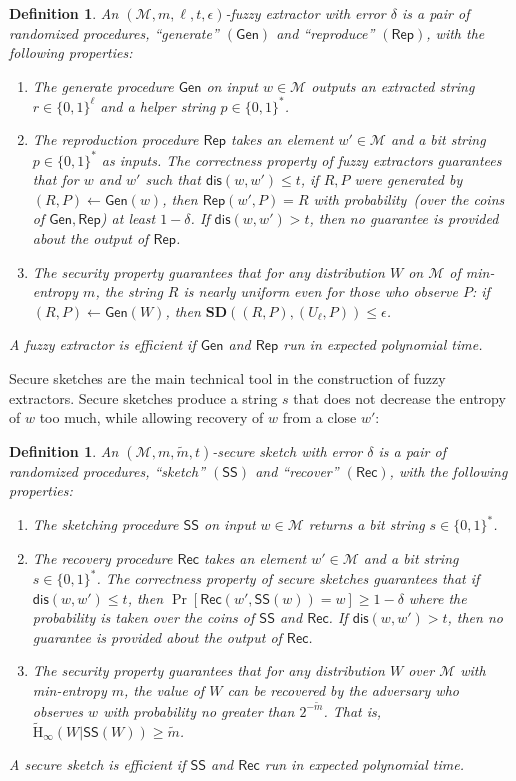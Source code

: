 \documentclass[11pt]{article}
\newcommand{\class}[1]{{\ensuremath{\mathsf{#1}}}}
\newcommand{\gen}{\ensuremath{\class{Gen}}\xspace}
\newcommand{\rep}{\ensuremath{\class{Rep}}\xspace}
\newcommand{\sketch}{\ensuremath{\class{SS}}\xspace}
\newcommand{\rec}{\ensuremath{\class{Rec}}\xspace}
\newcommand{\dis}{\ensuremath{\mathsf{dis}}}
\newcommand{\Hav}{\tilde{\mathrm{H}}_\infty}
\newtheorem{definition}[theorem]{Definition}
\begin{document}
\begin{definition}%
\label{def:fuzzy extractor}
An $(\mathcal{M}, m, \ell, t, \epsilon)$-\emph{fuzzy extractor} with error $\delta$ is a pair of randomized procedures, ``generate'' $(\gen)$ and ``reproduce'' $(\rep)$, with the following properties: 
\begin{enumerate}
\item The generate procedure \gen on input $w\in \mathcal{M}$ outputs an extracted string $r\in\{0,1\}^\ell$ and a helper string $p\in\{0,1\}^*$.
\item The reproduction procedure \rep takes an element $w'\in \mathcal{M}$ and a bit string $p\in\{0,1\}^*$ as inputs.  The \emph{correctness} property of fuzzy extractors guarantees that for $w$ and $w'$ such that $\dis(w,w')\leq t$, if $R,P$ were generated by $(R,P)\leftarrow\gen(w)$, then $\rep(w',P)=R$ with probability~(over the coins of $\gen, \rep$) at least $1-\delta$.  If $\dis(w,w')>t$, then no guarantee is provided about the output of \rep.
\item The \emph{security} property guarantees that for any distribution $W$ on $\mathcal{M}$ of min-entropy $m$, the string $R$ is nearly uniform even for those who observe $P$:  if $(R,P)\leftarrow\gen (W)$, then $\mathbf{SD}((R,P),(U_\ell,P))\leq \epsilon$.
\end{enumerate}
A fuzzy extractor is efficient if $\gen$ and $\rep$ run in expected polynomial time.
\end{definition}

Secure sketches are the main technical tool in the construction of fuzzy extractors.  Secure sketches produce a string $s$ that does not decrease the entropy of $w$ too much, while allowing recovery of $w$ from a  close $w'$:
\begin{definition}%
\label{def:secure sketch}
An $(\mathcal{M},m, \tilde{m}, t)$-\emph{secure sketch} with error $\delta$ is a pair of randomized procedures, ``sketch'' $(\sketch)$ and ``recover'' $(\rec)$, with the following properties:
\begin{enumerate}
\item The sketching procedure \sketch on input $w\in\mathcal{M}$ returns a bit string $s\in\{0,1\}^*$.
\item The recovery procedure \rec takes an element $w'\in\mathcal{M}$ and a bit string $s\in\{0,1\}^*$.  The \emph{correctness} property of secure sketches guarantees that if $\dis(w,w')\leq t$, then $\Pr[\rec(w',\sketch(w))=w]\geq 1-\delta$ where the probability is taken over the coins of $\sketch$ and $\rec$.  If $\dis(w,w')>t$, then no guarantee is provided about the output of \rec.
\item The \emph{security} property guarantees that for any distribution $W$ over $\mathcal{M}$ with min-entropy $m$, the value of $W$ can be recovered by the adversary who observes $w$ with probability no greater than $2^{-\tilde{m}}$.  That is, $\Hav(W|\sketch(W))\geq \tilde{m}$.
\end{enumerate}
A secure sketch is \emph{efficient} if \sketch and \rec run in expected polynomial time. 
\end{definition}
\end{document}
